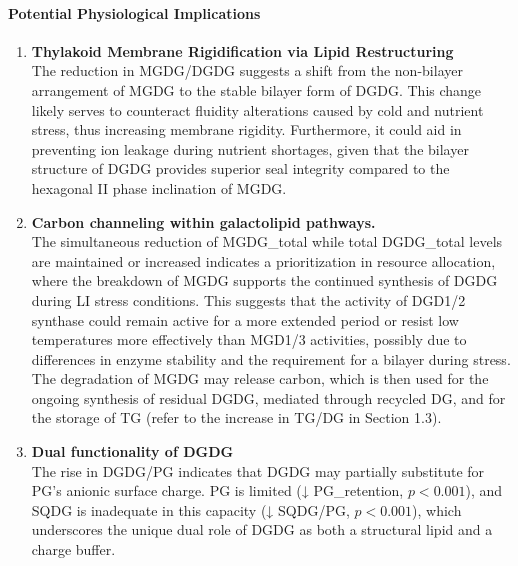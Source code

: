 \documentclass[10pt,letterpaper]{article}
\begin{document}
\paragraph{Potential Physiological Implications}
\begin{enumerate}
  \item \textbf{Thylakoid Membrane Rigidification via Lipid Restructuring} \\
        The reduction in MGDG/DGDG suggests a shift from the non-bilayer arrangement of MGDG to the stable bilayer form of DGDG. This change likely serves to counteract fluidity alterations caused by cold and nutrient stress, thus increasing membrane rigidity. Furthermore, it could aid in preventing ion leakage during nutrient shortages, given that the bilayer structure of DGDG provides superior seal integrity compared to the hexagonal II phase inclination of MGDG.
  
  \item \textbf{Carbon channeling within galactolipid pathways.} \\ 
        The simultaneous reduction of MGDG\_total while total DGDG\_total levels are maintained or increased indicates a prioritization in resource allocation, where the breakdown of MGDG supports the continued synthesis of DGDG during LI stress conditions. This suggests that the activity of DGD1/2 synthase could remain active for a more extended period or resist low temperatures more effectively than MGD1/3 activities, possibly due to differences in enzyme stability and the requirement for a bilayer during stress. The degradation of MGDG may release carbon, which is then used for the ongoing synthesis of residual DGDG, mediated through recycled DG, and for the storage of TG (refer to the increase in TG/DG in Section 1.3).
  
  \item \textbf{Dual functionality of DGDG} \\ 
        The rise in DGDG/PG indicates that DGDG may partially substitute for PG’s anionic surface charge. %
        PG is limited (↓ PG\_retention, \(p<0.001\)), and SQDG is inadequate in this capacity (↓ SQDG/PG, \(p<0.001\)), which underscores the unique dual role of DGDG as both a structural lipid and a charge buffer.
\end{enumerate}
\end{document}
